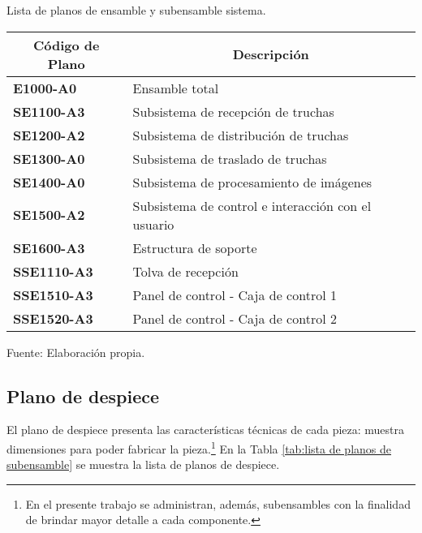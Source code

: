 \begin{mytable}[H]
	\footnotesize\centering
	\caption{Lista de planos de ensamble y subensamble sistema.}
	\label{tab:lista de planos de ensamble y subensamble}
	\begin{tabular}{|l|l|}
		\hline
		\multicolumn{1}{|c|}{\textbf{Código de Plano}} & \multicolumn{1}{c|}{\textbf{Descripción}} \\ \hline
		\textbf{E1000-A0}         & Ensamble total  \\ \hline
		\textbf{SE1100-A3}        & Subsistema de recepción de truchas  \\ \hline
		\textbf{SE1200-A2}        & Subsistema de distribución de truchas \\ \hline
		\textbf{SE1300-A0}        & Subsistema de traslado de truchas \\ \hline
		\textbf{SE1400-A0}        & Subsistema de procesamiento de imágenes \\ \hline
		\textbf{SE1500-A2}        & Subsistema de control e interacción con el usuario\\ \hline
		\textbf{SE1600-A3}         & Estructura de soporte  \\ \hline
		\textbf{SSE1110-A3}        & Tolva de recepción \\ \hline
		\textbf{SSE1510-A3}        & Panel de control - Caja de control 1\\ \hline
		\textbf{SSE1520-A3}        & Panel de control - Caja de control 2\\ \hline
	\end{tabular}
	\begin{myflushcenteraftertable}	
		Fuente: Elaboración propia.
	\end{myflushcenteraftertable}
\end{mytable}

\vspace{-2.0 em}
\subsection{Plano de despiece}

El plano de despiece presenta las características técnicas de cada pieza: muestra dimensiones para poder fabricar la pieza.\footnote{En el presente trabajo se administran, además, subensambles con la finalidad de brindar mayor detalle a cada componente.} En la Tabla \ref{tab:lista de planos de subensamble} se muestra la lista de planos de despiece. 

